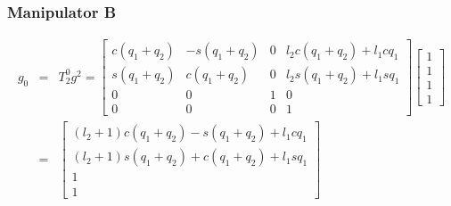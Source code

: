 \documentclass[11pt]{article}
\begin{document}
\subsubsection*{Manipulator B}
\begin{eqnarray*}
g_0 &=& T^0_2 g^2 = 
\begin{bmatrix}
c (q_1 + q_2) & - s (q_1 + q_2) & 0  & l_2 c (q_1 + q_2) + l_1 c q_1 \\
s (q_1 + q_2) & c (q_1 + q_2)   & 0  & l_2 s (q_1 + q_2) + l_1 s q_1 \\
0     & 0       & 1  & 0        \\
0     & 0       & 0  & 1
\end{bmatrix}
\begin{bmatrix}
1 \\
1 \\
1 \\
1
\end{bmatrix} \\
&=&
\begin{bmatrix}
(l_2 + 1) c (q_1 + q_2) - s (q_1 + q_2) + l_1 c q_1 \\
(l_2 + 1) s (q_1 + q_2) + c (q_1 + q_2) + l_1 s q_1 \\
1 \\
1
\end{bmatrix}
\end{eqnarray*}
\end{document}
